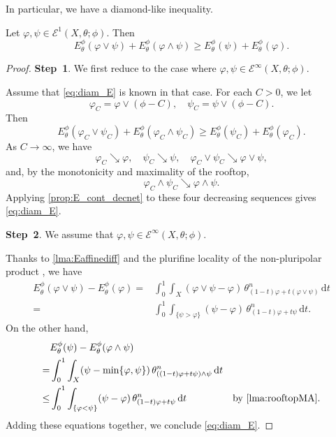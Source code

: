 In particular, we have a diamond-like inequality.
\begin{corollary}\label{cor:diam_E}
    Let $\varphi,\psi\in \mathcal{E}^1(X,\theta;\phi)$. Then
    \begin{equation}\label{eq:diam_E}
    E_{\theta}^{\phi}(\varphi\lor \psi)+E_{\theta}^{\phi}(\varphi\land \psi)\geq E_{\theta}^{\phi}(\psi)+E_{\theta}^{\phi}(\varphi).
    \end{equation}
\end{corollary}
\begin{proof}
    \textbf{Step~1}. We first reduce to the case where $\varphi,\psi \in \mathcal{E}^{\infty}(X,\theta;\phi)$.

    Assume that \eqref{eq:diam_E} is known in that case. For each $C>0$, we let
    \[
    \varphi_C=\varphi\lor (\phi-C),\quad \psi_C=\psi\lor (\phi-C).
    \]
    Then
    \[
    E_{\theta}^{\phi}(\varphi_C\lor \psi_C)+E_{\theta}^{\phi}(\varphi_C\land \psi_C)\geq E_{\theta}^{\phi}(\psi_C)+E_{\theta}^{\phi}(\varphi_C).
    \]
    As $C\to\infty$, we have
    \[
        \varphi_C\searrow\varphi,\quad \psi_C\searrow\psi,\quad \varphi_C\lor\psi_C\searrow\varphi\lor\psi,
    \]
    and, by the monotonicity and maximality of the rooftop,
    \[
        \varphi_C\land\psi_C\searrow\varphi\land\psi.
    \]
    Applying \cref{prop:E_cont_decnet} to these four decreasing sequences gives \eqref{eq:diam_E}.

    \textbf{Step~2}. We assume that $\varphi,\psi \in \mathcal{E}^{\infty}(X,\theta;\phi)$.

    Thanks to \cref{lma:Eaffinediff} and the plurifine locality of the non-pluripolar product , we have
    \[
    \begin{aligned}
    E_{\theta}^{\phi}(\varphi\lor \psi)-E_{\theta}^{\phi}(\varphi)=&\int_0^1\int_X (\varphi\lor \psi-\varphi)\,\theta_{(1-t)\varphi+t(\varphi\lor \psi)}^n\,\mathrm{d}t\\
    =& \int_0^1 \int_{\{\psi>\varphi\}} (\psi-\varphi)\,\theta_{(1-t)\varphi+t\psi}^n\,\mathrm{d}t.
    \end{aligned}
    \]
    On the other hand,
    \[
    \begin{aligned}
        &E_{\theta}^{\phi}(\psi)-E_{\theta}^{\phi}(\varphi\land \psi)\\
        =& \int_0^1 \int_X (\psi-\min\{\varphi,\psi\})\,\theta_{((1-t)\varphi+t\psi)\land \psi}^n\,\mathrm{d}t\\
        \leq & \int_0^1 \int_{\{\varphi<\psi\}} (\psi-\varphi)\,\theta_{(1-t)\varphi+t\psi}^n\,\mathrm{d}t& \textup{by \cref{lma:rooftopMA}}.
    \end{aligned}
    \]
    Adding these equations together, we conclude \eqref{eq:diam_E}.
\end{proof}


